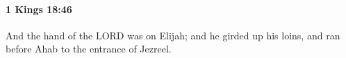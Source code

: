
		\paragraph{1 Kings 18:46} %
			\label{1KINGS-18-46}

			And the hand of the LORD was on Elijah; and he girded up his loins, and ran before Ahab to the entrance of Jezreel.

